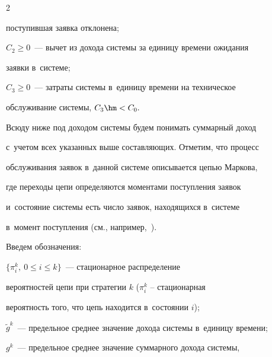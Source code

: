 \begin{multicols}{2}
\begin{description}
поступившая заявка отклонена;\\[-14.5pt]


\item


$C_2\geqslant 0$~--- вычет из дохода системы за единицу времени ожидания


заявки в~системе;\\[-14.5pt]


\item


$C_3\geqslant 0$~--- затраты системы в~единицу времени на техническое


обслуживание системы, $C_3\hm<C_0.$


\end{description}





Всюду ниже под доходом системы будем понимать суммарный доход 


с~учетом всех указанных выше со\-став\-ля\-ющих. Отметим, что процесс


обслуживания заявок в~данной сис\-те\-ме описывается цепью Маркова,


где переходы цепи определяются моментами поступления заявок 


и~состояние сис\-те\-мы есть чис\-ло заявок, находящихся в~сис\-те\-ме 


в~момент поступления (см., например,~\cite{8-aga, 9-aga}).





Введем обозначения:


\begin{description}


\item


$\{\pi_i^k,\ 0\leqslant i\leqslant k\}$~--- стационарное распределение


вероятностей цепи при стратегии $k$ ($\pi_i^k$ -- стационарная


вероятность того, что цепь находится в~состоянии $i$);\\[-14.5pt]


\item


$\tilde{g}^k$~--- предельное среднее значение дохода системы в~единицу времени;\\[-14.5pt]


\item


$g^k$~--- предельное среднее значение суммарного дохода системы,



\end{description}
\end{multicols}
